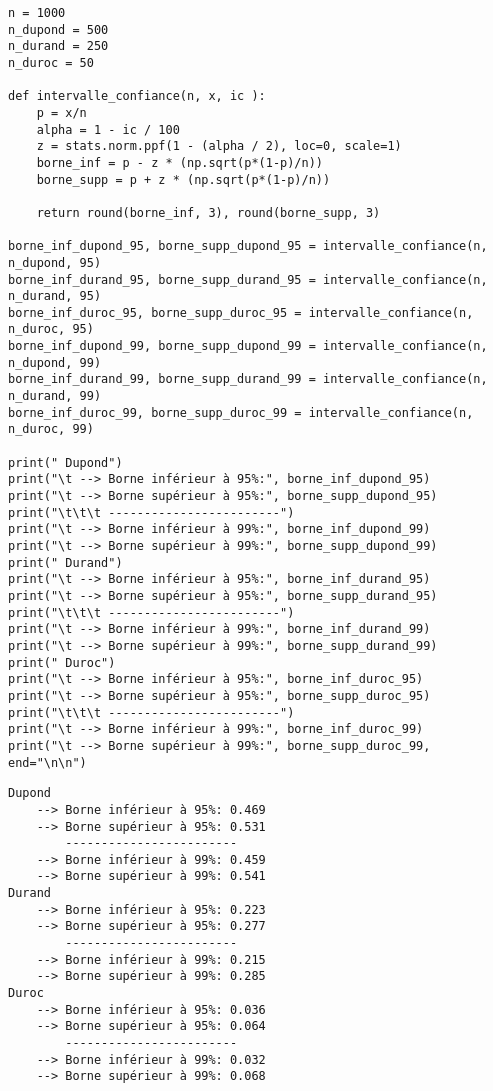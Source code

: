 \begin{lstlisting}[style=myPython, caption=Code Python question 3, frame=lines]
n = 1000
n_dupond = 500
n_durand = 250
n_duroc = 50

def intervalle_confiance(n, x, ic ):
    p = x/n
    alpha = 1 - ic / 100
    z = stats.norm.ppf(1 - (alpha / 2), loc=0, scale=1)
    borne_inf = p - z * (np.sqrt(p*(1-p)/n))
    borne_supp = p + z * (np.sqrt(p*(1-p)/n))

    return round(borne_inf, 3), round(borne_supp, 3)

borne_inf_dupond_95, borne_supp_dupond_95 = intervalle_confiance(n, n_dupond, 95)
borne_inf_durand_95, borne_supp_durand_95 = intervalle_confiance(n, n_durand, 95)
borne_inf_duroc_95, borne_supp_duroc_95 = intervalle_confiance(n, n_duroc, 95)
borne_inf_dupond_99, borne_supp_dupond_99 = intervalle_confiance(n, n_dupond, 99)
borne_inf_durand_99, borne_supp_durand_99 = intervalle_confiance(n, n_durand, 99)
borne_inf_duroc_99, borne_supp_duroc_99 = intervalle_confiance(n, n_duroc, 99)

print(" Dupond")
print("\t --> Borne inférieur à 95%:", borne_inf_dupond_95)
print("\t --> Borne supérieur à 95%:", borne_supp_dupond_95)
print("\t\t\t ------------------------")
print("\t --> Borne inférieur à 99%:", borne_inf_dupond_99)
print("\t --> Borne supérieur à 99%:", borne_supp_dupond_99)
print(" Durand")
print("\t --> Borne inférieur à 95%:", borne_inf_durand_95)
print("\t --> Borne supérieur à 95%:", borne_supp_durand_95)
print("\t\t\t ------------------------")
print("\t --> Borne inférieur à 99%:", borne_inf_durand_99)
print("\t --> Borne supérieur à 99%:", borne_supp_durand_99)
print(" Duroc")
print("\t --> Borne inférieur à 95%:", borne_inf_duroc_95)
print("\t --> Borne supérieur à 95%:", borne_supp_duroc_95)
print("\t\t\t ------------------------")
print("\t --> Borne inférieur à 99%:", borne_inf_duroc_99)
print("\t --> Borne supérieur à 99%:", borne_supp_duroc_99, end="\n\n")
\end{lstlisting}

\begin{lstlisting}[style=myLog, caption=Résultat du code, frame=lines]
Dupond
    --> Borne inférieur à 95%: 0.469
    --> Borne supérieur à 95%: 0.531
        ------------------------
    --> Borne inférieur à 99%: 0.459
    --> Borne supérieur à 99%: 0.541
Durand
    --> Borne inférieur à 95%: 0.223
    --> Borne supérieur à 95%: 0.277
        ------------------------
    --> Borne inférieur à 99%: 0.215
    --> Borne supérieur à 99%: 0.285
Duroc
    --> Borne inférieur à 95%: 0.036
    --> Borne supérieur à 95%: 0.064
        ------------------------
    --> Borne inférieur à 99%: 0.032
    --> Borne supérieur à 99%: 0.068
\end{lstlisting}

